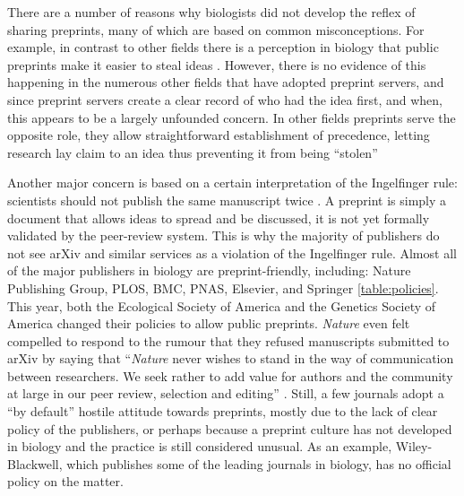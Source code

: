 \documentclass[letterpaper,twocolumn,superscriptaddress,showkeys,longbibliography]{revtex4-1}
\begin{document}
There are a number of reasons why biologists did not develop the reflex of
sharing preprints, many of which are based on common misconceptions. For
example, in contrast to other fields there is a perception in biology that
public preprints make it easier to steal ideas \cite{gin11}. However, there is
no evidence of this happening in the numerous other fields that have adopted
preprint servers, and since preprint servers create a clear record of who had
the idea first, and when, this appears to be a largely unfounded concern. In
other fields preprints serve the opposite role, they allow straightforward
establishment of precedence, letting research lay claim to an idea thus
preventing it from being ``stolen'' \cite{gin11}

Another major concern is based on a certain interpretation of the Ingelfinger
rule: scientists should not publish the same manuscript twice \cite{alt96}. A
preprint is simply a document that allows ideas to spread and be discussed, it
is not yet formally validated by the peer-review system. This is why the
majority of publishers do not see arXiv and similar services as a violation of
the Ingelfinger rule. Almost all of the major publishers in biology are
preprint-friendly, including: Nature Publishing Group, PLOS, BMC, PNAS,
Elsevier, and Springer \ref{table:policies}. This year, both the Ecological
Society of America and the Genetics Society of America changed their policies to
allow public preprints. \emph{Nature} even felt compelled to respond to the
rumour that they refused manuscripts submitted to arXiv by saying that
``\emph{Nature} never wishes to stand in the way of communication between
researchers. We seek rather to add value for authors and the community at large
in our peer review, selection and editing'' \cite{nat05}.  Still, a few journals
adopt a ``by default'' hostile attitude towards preprints, mostly due to the
lack of clear policy of the publishers, or perhaps because a preprint culture
has not developed in biology and the practice is still considered unusual. As an
example, Wiley-Blackwell, which publishes some of the leading journals in
biology, has no official policy on the matter.
\end{document}
